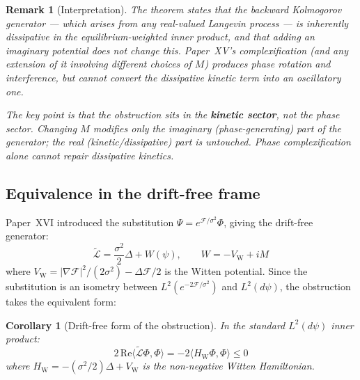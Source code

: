 \documentclass[12pt]{article}
\newtheorem{corollary}[theorem]{Corollary}
\newtheorem{remark}[theorem]{Remark}
\newcommand{\Fcal}{\mathcal{F}}
\newcommand{\Lcal}{\mathcal{L}}
\begin{document}
\begin{remark}[Interpretation]
The theorem states that the backward Kolmogorov generator --- which arises from any real-valued Langevin process --- is inherently dissipative in the equilibrium-weighted inner product, and that \textit{adding an imaginary potential does not change this}. Paper~XV's complexification (and any extension of it involving different choices of $M$) produces phase rotation and interference, but cannot convert the dissipative kinetic term into an oscillatory one.

The key point is that the obstruction sits in the \textbf{kinetic sector}, not the phase sector. Changing $M$ modifies only the imaginary (phase-generating) part of the generator; the real (kinetic/dissipative) part is untouched. Phase complexification alone cannot repair dissipative kinetics.
\end{remark}

\subsection{Equivalence in the drift-free frame}

Paper~XVI introduced the substitution $\Psi = e^{\Fcal/\sigma^2}\Phi$, giving the drift-free generator:
\begin{equation}
    \tilde{\Lcal} = \frac{\sigma^2}{2}\Delta + W(\psi), \qquad W = -V_{\mathrm{W}} + iM
\end{equation}
where $V_{\mathrm{W}} = |\nabla\Fcal|^2/(2\sigma^2) - \Delta\Fcal/2$ is the Witten potential. Since the substitution is an isometry between $L^2(e^{-2\Fcal/\sigma^2})$ and $L^2(d\psi)$, the obstruction takes the equivalent form:

\begin{corollary}[Drift-free form of the obstruction]\label{cor:driftfree}
In the standard $L^2(d\psi)$ inner product:
\begin{equation}\label{eq:witten_dissipation}
    2\,\mathrm{Re}\langle \tilde{\Lcal}\Phi, \Phi\rangle = -2\langle H_{\mathrm{W}}\Phi, \Phi\rangle \leq 0
\end{equation}
where $H_{\mathrm{W}} = -(\sigma^2/2)\Delta + V_{\mathrm{W}}$ is the non-negative Witten Hamiltonian.
\end{corollary}
\end{document}
